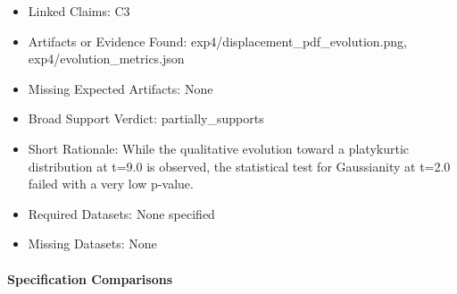 \documentclass[11pt]{article}
\begin{document}
\begin{itemize}

\item Linked Claims: C3

\item Artifacts or Evidence Found: exp4/displacement\_pdf\_evolution.png, exp4/evolution\_metrics.json

\item Missing Expected Artifacts: None

\item Broad Support Verdict: partially\_supports

\item Short Rationale: While the qualitative evolution toward a platykurtic distribution at t=9.0 is observed, the statistical test for Gaussianity at t=2.0 failed with a very low p-value.

\item Required Datasets: None specified

\item Missing Datasets: None

\end{itemize}

\paragraph{Specification Comparisons}
\end{document}
